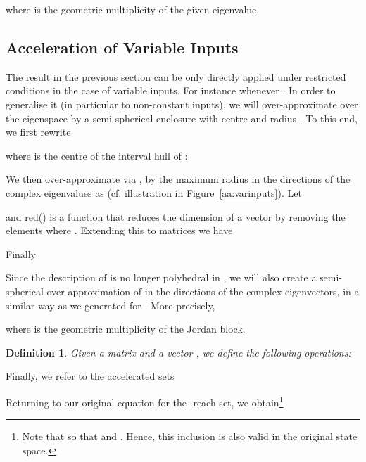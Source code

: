 \documentclass{IEEEtran}
\newtheorem{definition}{Definition}
\begin{document}
where  is the geometric multiplicity of the given eigenvalue.

\subsection{Acceleration of Variable Inputs}\label{sec:var_inpur_accel}


The result in the previous section can be only directly applied under restricted conditions in the case of variable inputs. For
instance whenever . 
In order to generalise it (in particular to non-constant inputs), we will
over-approximate  over the eigenspace by a semi-spherical enclosure with
centre  and radius .  To this end, we first rewrite

where  is the centre of the interval hull of :

We then over-approximate  via , by the maximum radius in
the directions of the complex eigenvalues as (cf. illustration in Figure~\ref{aa:varinputs}). Let


and red() is a function that reduces the dimension of a vector by removing the elements where .
Extending this to matrices we have

Finally


Since the description of  is no longer polyhedral in ,
we will also create a semi-spherical over-approximation  of
 in the directions of the complex eigenvectors, in a
similar way as we generated  for . 
More precisely,

where  is the geometric multiplicity of the Jordan block.
\begin{definition}
Given a matrix  and a vector , we define the following operations:

\end{definition}
Finally, we refer to the accelerated sets 


Returning to our original equation for the -reach set, we obtain\footnote{Note that  so that  and .  
Hence, this inclusion is also valid in the original state space. }
\end{document}
